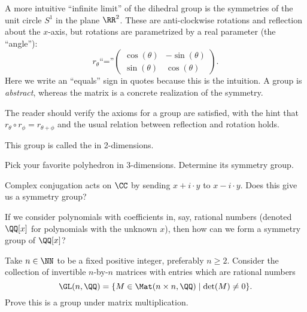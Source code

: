 \begin{example}
A more intuitive ``infinite limit'' of the dihedral group is the
symmetries of the unit circle $S^{1}$ in the plane $\RR^{2}$. These are
anti-clockwise rotations and reflection about the $x$-axis, but
rotations are parametrized by a real parameter (the ``angle''):
\begin{equation}
  r_{\theta} \mbox{``=''} \begin{pmatrix}\cos(\theta) & -\sin(\theta)\\
    \sin(\theta) & \cos(\theta)
  \end{pmatrix}.
\end{equation}
Here we write an ``equals'' sign in quotes because this is the
intuition. A group is \emph{abstract}, whereas the matrix is a concrete
realization of the symmetry.

The reader should verify the axioms for a group are satisfied, with the
hint that $r_{\theta}\circ r_{\phi} = r_{\theta+\phi}$ and the usual
relation between reflection and rotation holds.

This group is called the  in 2-dimensions.
\end{example}

\begin{exercise}
Pick your favorite polyhedron in 3-dimensions. Determine its symmetry group.
\end{exercise}

\begin{exercise}
Complex conjugation acts on $\CC$ by sending $x+i\cdot y$ to $x-i\cdot y$.
Does this give us a symmetry group?
\end{exercise}

\begin{exercise}
If we consider polynomials with coefficients in, say, rational numbers
(denoted $\QQ[x]$ for polynomials with the unknown $x$), then how can we
form a symmetry group of $\QQ[x]$?
\end{exercise}

\begin{exercise}
  Take $n\in\NN$ to be a fixed positive integer, preferably $n\geq2$.
  Consider the collection of invertible $n$-by-$n$ matrices with entries
  which are rational numbers
  $$\GL(n, \QQ) = \{ M\in\Mat(n\times n, \QQ) \mid \det(M)\neq0\}.$$
  Prove this is a group under matrix multiplication.
\end{exercise}
